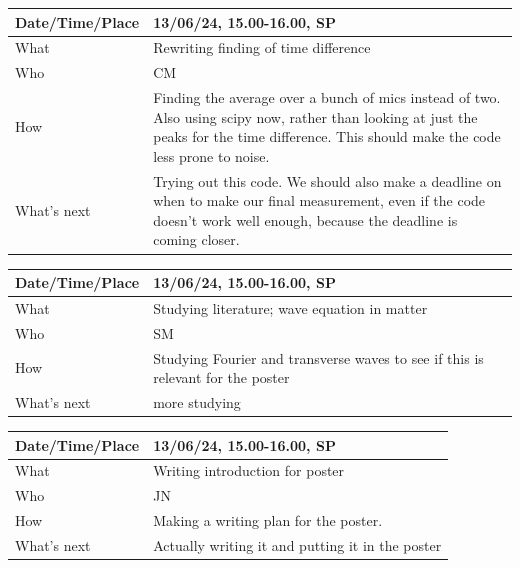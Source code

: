 \documentclass{article}
\begin{document}
\begin{table}[H]
\begin{tabular}{|p{1.5in}|p{4in}|}
\hline
Date/Time/Place & 13/06/24, 15.00-16.00, SP \\ \hline
What            &  Rewriting finding of time difference\\ \hline
Who             &  CM\\ \hline
How             & Finding the average over a bunch of mics instead of two. Also using scipy now, rather than looking at just the peaks for the time difference. This should make the code less prone to noise.\\ \hline
What's next     &  Trying out this code. We should also make a deadline on when to make our final measurement, even if the code doesn't work well enough, because the deadline is coming closer.\\ \hline
\end{tabular}
\end{table}

\begin{table}[H]
\begin{tabular}{|p{1.5in}|p{4in}|}
\hline
Date/Time/Place & 13/06/24, 15.00-16.00, SP \\ \hline
What            & Studying literature; wave equation in matter \\ \hline
Who             & SM \\ \hline
How             & Studying Fourier and transverse waves to see if this is relevant for the poster  \\ \hline
What's next     & more studying \\ \hline
\end{tabular}
\end{table}

\begin{table}[H]
\begin{tabular}{|p{1.5in}|p{4in}|}
\hline
Date/Time/Place & 13/06/24, 15.00-16.00, SP \\ \hline
What            & Writing introduction for poster \\ \hline
Who             & JN \\ \hline
How             & Making a writing plan for the poster. \\ \hline
What's next     & Actually writing it and putting it in the poster \\ \hline
\end{tabular}
\end{table}
\end{document}
